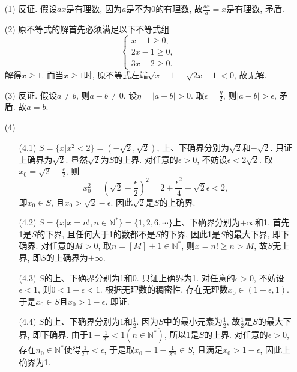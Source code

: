 \documentclass[UTF8,11pt, a4paper, oneside, fontset=none]{ctexbook}
\begin{document}
\begin{itemize}

\item[(1)] 反证. 假设$ax$是有理数, 因为$a$是不为0的有理数, 故$\frac{ax}{a} = x$是有理数, 矛盾.

\item[(2)] 原不等式的解首先必须满足以下不等式组
\[
\begin{cases}
x-1 \geq 0,\\
2x-1 \geq 0,\\
3x-2 \geq 0.
\end{cases}
\]
解得$x \geq 1$. 而当$x \geq 1$时, 原不等式左端$\sqrt{x-1} - \sqrt{2x-1} <0$, 故无解.

\item[(3)] 反证. 假设$a \neq b$, 则$a -b \neq 0$. 设$\eta = |a-b|>0$. 取$\epsilon = \frac{\eta}{2}$, 则$|a-b| > \epsilon$, 矛盾. 故$a = b$.


\item[(4)]
\begin{itemize}
\item[(4.1)] $S = \{x| x^2 <2 \} = (-\sqrt 2, \sqrt 2)$, 上、下确界分别为$\sqrt 2$和$-\sqrt 2$. 只证上确界为$\sqrt 2$. 显然$\sqrt 2$为$S$的上界. 对任意的$\epsilon >0$, 不妨设$\epsilon < 2 \sqrt 2$. 取$x_0 = \sqrt 2 - \frac{\epsilon}{2}$, 则
\[
x_0^2 = (\sqrt 2 - \frac{\epsilon}{2})^2 = 2 + \frac{\epsilon^2}{4} - \sqrt 2 \epsilon < 2,
\]
即$x_0 \in S$, 且$x_0 > \sqrt 2 -\epsilon$. 因此$\sqrt 2$是$S$的上确界.

\item[(4.2)] $S = \{ x | x = n!, n \in \mathbb N^*\} = \{1, 2, 6, \cdots \}$上、下确界分别为$+\infty$和1. 首先1是$S$的下界, 且任何大于1的数都不是$S$的下界, 因此1是$S$的最大下界, 即下确界. 对任意的$M>0$, 取$n = [M] +1 \in \mathbb N^*$, 则$x = n! \geq n >M$, 故$S$无上界, 即$S$的上确界为$+\infty$.

\item[(4.3)] $S$的上、下确界分别为1和0. 只证上确界为1. 对任意的$\epsilon>0$, 不妨设$\epsilon<1$, 则$0<1-\epsilon<1$. 根据无理数的稠密性, 存在无理数$x_0 \in (1-\epsilon, 1)$. 于是$x_0 \in S$且$x_0 >1-\epsilon$. 即证.

\item[(4.4)] $S$的上、下确界分别为1和$\frac{1}{2}$. 因为$S$中的最小元素为$\frac{1}{2}$, 故$\frac{1}{2}$是$S$的最大下界, 即下确界. 由于$1 - \frac{1}{2^n}<1 (n \in \mathbb N^*)$, 所以1是$S$的上界. 对任意的$\epsilon >0$, 存在$n_0 \in \mathbb N^*$使得$\frac{1}{2^{n_0}} < \epsilon$, 于是取$x_0 = 1 -\frac{1}{2^{n_0}} \in S $, 且满足$x_0 > 1 - \epsilon$, 因此上确界为1.
\end{itemize}


\end{itemize}
\end{document}
